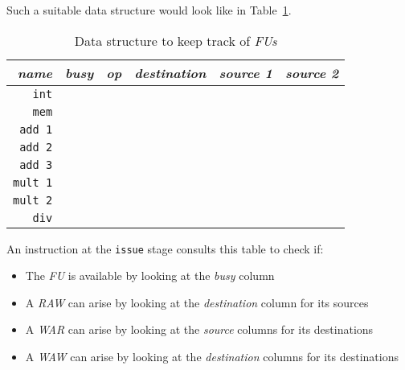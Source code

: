 \documentclass[english]{article}
\begin{document}
Such a suitable data structure would look like in Table~\ref{tab:data-structure-keep-track-functional-units}.

\begin{table}
  \centering
  \begin{tabular}{r|c|cccc}
    \hline
    \textit{name}   & \textit{busy} & \textit{op} & \textit{destination} & \textit{source 1} & \textit{source 2} \\ \hline
    \texttt{int}    &               &             &                      &                   &                   \\
    \texttt{mem}    &               &             &                      &                   &                   \\ \hline
    \texttt{add 1}  &               &             &                      &                   &                   \\
    \texttt{add 2}  &               &             &                      &                   &                   \\
    \texttt{add 3}  &               &             &                      &                   &                   \\ \hline
    \texttt{mult 1} &               &             &                      &                   &                   \\
    \texttt{mult 2} &               &             &                      &                   &                   \\ \hline
    \texttt{div}    &               &             &                      &                   &                   \\
  \end{tabular}
  \caption{Data structure to keep track of \textit{FUs}}
  \label{tab:data-structure-keep-track-functional-units}
\end{table}

An instruction at the \texttt{issue} stage consults this table to check if:

\begin{itemize}
  \item The \textit{FU} is available by looking at the \textit{busy} column
  \item A \textit{RAW} can arise by looking at the \textit{destination} column for its sources
  \item A \textit{WAR} can arise by looking at the \textit{source} columns for its destinations
  \item A \textit{WAW} can arise by looking at the \textit{destination} columns for its destinations
\end{itemize}
\end{document}
